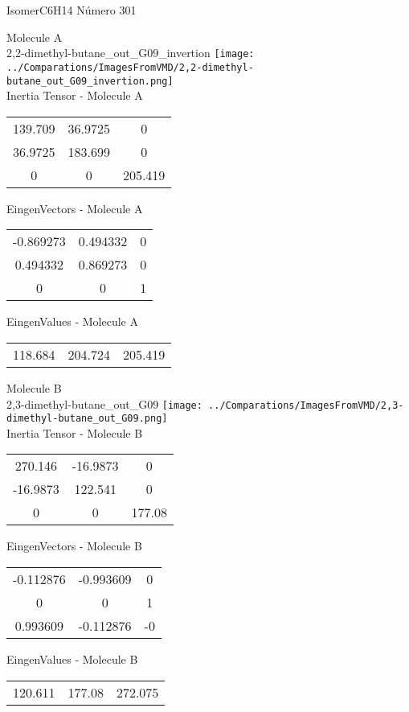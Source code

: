 \vtab[-2cm]
\begin{center}
{\large IsomerC6H14 \tab Número 301}
\end{center}
\begin{multicols}{2}
\begin{center}

Molecule A \\ 
2,2-dimethyl-butane\_out\_G09\_invertion
\texttt{[image: ../Comparations/ImagesFromVMD/2,2-dimethyl-butane\_out\_G09\_invertion.png]}
\\
Inertia Tensor - Molecule A \\
\vtab

\begin{tabular}{|c c c|}
139.709	 & 	36.9725	 & 	0	 \\
36.9725	 & 	183.699	 & 	0	 \\
0	 & 	0	 & 	205.419
\end{tabular}

\vtab
 EingenVectors - Molecule A     \\
\vtab
\begin{tabular}{|c c c|}
-0.869273	 & 	0.494332	 & 	0	 \\
0.494332	 & 	0.869273	 & 	0	 \\
0	 & 	0	 & 	1
\end{tabular}

\vtab
 EingenValues - Molecule A     \\
\vtab
\begin{tabular}{|c c c|}
118.684	 & 	204.724	 & 	205.419	 \\
\end{tabular}
\columnbreak

Molecule B \\ 
2,3-dimethyl-butane\_out\_G09
\texttt{[image: ../Comparations/ImagesFromVMD/2,3-dimethyl-butane\_out\_G09.png]}
\\
Inertia Tensor - Molecule B \\
\vtab

\begin{tabular}{|c c c|}
270.146	 & 	-16.9873	 & 	0	 \\
-16.9873	 & 	122.541	 & 	0	 \\
0	 & 	0	 & 	177.08
\end{tabular}

\vtab
 EingenVectors - Molecule B     \\
\vtab
\begin{tabular}{|c c c|}
-0.112876	 & 	-0.993609	 & 	0	 \\
0	 & 	0	 & 	1	 \\
0.993609	 & 	-0.112876	 & 	-0
\end{tabular}

\vtab
 EingenValues - Molecule B     \\
\vtab
\begin{tabular}{|c c c|}
120.611	 & 	177.08	 & 	272.075	 \\
\end{tabular}

\end{center}
\end{multicols}

